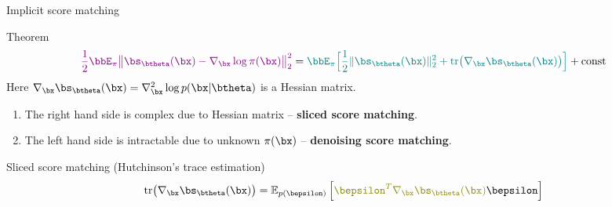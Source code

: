 \begin{frame}{Implicit score matching}
	\vspace{-0.3cm}
	\begin{block}{Theorem}
		\vspace{-0.6cm}
		\[
		{\color{violet}\frac{1}{2} \bbE_{\pi}\bigl\| \bs_{\btheta}(\bx) - \nabla_\bx \log \pi(\bx) \bigr\|^2_2} = {\color{teal}\bbE_{\pi}\Bigr[ \frac{1}{2}\| \bs_{\btheta}(\bx) \|_2^2 + \text{tr}\bigl(\nabla_{\bx} \bs_{\btheta}(\bx)\bigr) \Bigr]} + \text{const}
		\]
		Here $\nabla_{\bx} \bs_{\btheta}(\bx) = \nabla_{\bx}^2 \log p(\bx | \btheta)$ is a Hessian matrix.
	\end{block}
	\begin{enumerate}
		\item {\color{teal}The right hand side} is complex due to Hessian matrix -- \textbf{sliced score matching}.
		\item {\color{violet}The left hand side} is intractable due to unknown $\pi(\bx)$ -- \textbf{denoising score matching}. 
	\end{enumerate}
	\begin{block}{Sliced score matching (Hutchinson's trace estimation)}
	\vspace{-0.3cm}
	\[
		\text{tr}\bigl(\nabla_{\bx} \bs_{\btheta}(\bx)\bigr) = \mathbb{E}_{p(\bepsilon)} \left[ {\color{olive}\bepsilon^T \nabla_{\bx} \bs_{\btheta}(\bx)} \bepsilon \right]
	\]
	\end{block}
\end{frame}

